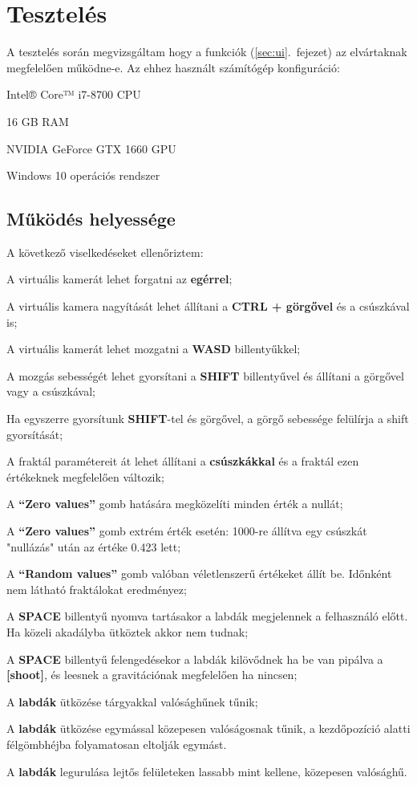 \section{Tesztelés}

A tesztelés során megvizsgáltam hogy a funkciók (\ref{sec:ui}.~fejezet) az elvártaknak megfelelően működne-e. Az ehhez használt számítógép konfiguráció:
\begin{compactitem}
	\item Intel® Core™ i7-8700 CPU
	\item 16 GB RAM
	\item NVIDIA GeForce GTX 1660 GPU
	\item Windows 10 operációs rendszer
\end{compactitem}

\subsection{Működés helyessége}

A következő viselkedéseket ellenőriztem:
\begin{compactenum}
	\item A virtuális kamerát lehet forgatni az \textbf{egérrel};
	\item A virtuális kamera nagyítását lehet állítani a \textbf{CTRL + görgővel} és a csúszkával is;
	\item A virtuális kamerát lehet mozgatni a \textbf{WASD} billentyűkkel;
	\item A mozgás sebességét lehet gyorsítani a \textbf{SHIFT} billentyűvel és állítani a görgővel vagy a csúszkával;
	\item Ha egyszerre gyorsítunk \textbf{SHIFT}-tel és görgővel, a görgő sebessége felülírja a shift gyorsítását;
	\item A fraktál paramétereit át lehet állítani a \textbf{csúszkákkal} és a fraktál ezen értékeknek megfelelően változik;
	\item A \textbf{``Zero values''} gomb hatására megközelíti minden érték a nullát;
	\item A \textbf{``Zero values''} gomb extrém érték esetén: 1000-re állítva egy csúszkát "nullázás" után az értéke 0.423 lett;
	\item A \textbf{``Random values''} gomb valóban véletlenszerű értékeket állít be. Időnként nem látható fraktálokat eredményez;
	\item A \textbf{SPACE} billentyű nyomva tartásakor a labdák megjelennek a felhasználó előtt. Ha közeli akadályba ütköztek akkor nem tudnak;
	\item A \textbf{SPACE} billentyű felengedésekor a labdák kilövődnek ha be van pipálva a \textbf{[shoot]}, és leesnek a gravitációnak megfelelően ha nincsen;
	\item A \textbf{labdák} ütközése tárgyakkal valósághűnek tűnik;
	\item A \textbf{labdák} ütközése egymással közepesen valóságosnak tűnik, a kezdőpozíció alatti félgömbhéjba folyamatosan eltolják egymást.
	\item A \textbf{labdák} legurulása lejtős felületeken lassabb mint kellene, közepesen valósághű.
\end{compactenum}

